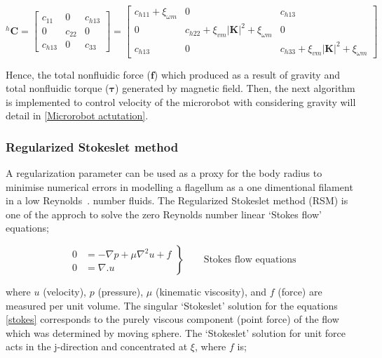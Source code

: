 \documentclass[12pt,a4paper,titlepage]{report}
\begin{document}
\begin{equation}
 ^{h}\bm{C} = \begin{bmatrix}
       c_{11}  & 0 		 & c_{h13}            \\[0.3em]
       0		 & c_{22}           & 0\\[0.3em]
       c_{h13}            	& 0 		& c_{33} 
     \end{bmatrix}
	=
	 \begin{bmatrix}
       c_{h11}+ \xi_{\omega m} & 0 		 & c_{h13}            \\[0.3em]
       0		 & c_{h22}+  \xi_{vm}|\bm{K}|^2 +\xi_{\omega m}          & 0\\[0.3em]
       c_{h13}            	& 0 		& c_{h33} + \xi_{vm}|\bm{K}|^2 +\xi_{\omega m}
     \end{bmatrix}
\label{C_Finalmatrix}
\end{equation}

Hence, the total nonfluidic force ($\bm{f}$) which produced as a result of gravity and total nonfluidic torque
($\bm{\tau}$) generated by magnetic field. Then, the next algorithm is implemented  to control velocity of the
microrobot with considering gravity will detail in \ref{Microrobot actutation}.





\subsubsection{Regularized Stokeslet method}\label{method2}

A regularization parameter can be used as a proxy for the body radius to minimise numerical errors
 in modelling a flagellum as a one dimentional filament in a low Reynolds~\citep{smith2009boundary}.
number fluids. The Regularized Stokeslet method (RSM) is one of the approch to solve the zero 
Reynolds number linear \lq{}Stokes flow\rq{} equations;



\begin{equation}
 \left.\begin{aligned}
        0 &= - \nabla p + \mu \nabla ^ 2 u + f \\
        0 &=\nabla . u
       \end{aligned}
 \right\}
 \qquad \text{Stokes flow equations}
\label{stokes}
\end{equation}

where $u$ (velocity), $p$ (pressure), $\mu $ (kinematic viscosity), and $f$ (force) are measured per unit
volume. The singular \lq{}Stokeslet\rq{} solution for the equations \ref{stokes} corresponds to the purely 
viscous component (point force) of the flow which was determined by moving sphere. 
The \lq{}Stokeslet\rq{} solution for unit force acts in the j-direction and concentrated at $\xi $, where $f$ is;
  
\end{document}
